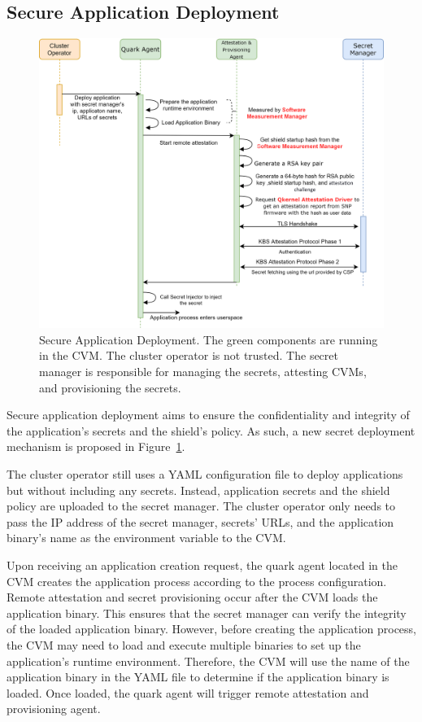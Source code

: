 \subsection{Secure Application Deployment}
\label{sec:secure_application_deployment}
\begin{figure}[!htb]
    \centering
    \includegraphics[height=0.5\textheight]{images/attestation_provisioning.png}
    \caption[Secure Application Deployment Workflow]{Secure Application Deployment. The green components are running in the \acrshort{CVM}. The cluster operator is not trusted. The secret manager is responsible for managing the secrets, attesting CVMs, and provisioning the secrets.}
    \label{fig:attestation_provisioning}
\end{figure}
Secure application deployment aims to ensure the confidentiality and integrity of the application’s secrets and the shield’s policy. As such, a new secret deployment mechanism is proposed in Figure~\ref{fig:attestation_provisioning}.

The cluster operator still uses a YAML configuration file to deploy applications but without including any secrets. Instead, application secrets and the shield policy are uploaded to the secret manager. The cluster operator only needs to pass the IP address of the secret manager, secrets’ URLs, and the application binary’s name as the environment variable 
to the \acrshort{CVM}. 

Upon receiving an application creation request, the quark agent located in the \acrshort{CVM} creates the application process according to the process configuration. Remote attestation and secret provisioning occur after the CVM loads the application binary. This ensures that the secret manager can verify the integrity of the loaded application binary. 
However, before creating the application process, the \acrshort{CVM} may need to load and execute multiple binaries to set up the application’s runtime environment. Therefore, the \acrshort{CVM} will use the name of the application binary in the YAML file to determine if the application binary is loaded. Once loaded, the quark agent will trigger remote attestation 
and provisioning agent.

